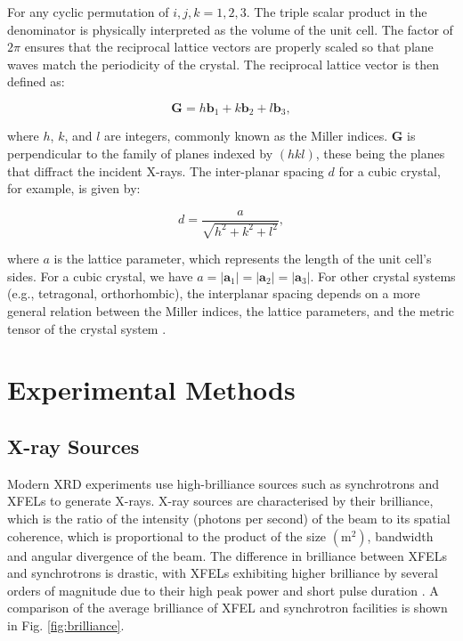 \documentclass[aps,prb,twocolumn,superscriptaddress]{revtex4-2}
\begin{document}
For any cyclic permutation of ${i,j,k} = {1, 2, 3}$. The triple scalar product
in the denominator is physically interpreted as the volume of the unit cell. The
factor of $2\pi$ ensures that the reciprocal lattice vectors are properly scaled
so that plane waves match the periodicity of the crystal. The reciprocal lattice
vector is then defined as:

\begin{equation}\label{eq:reciprocal_vector}
    \mathbf{G} = h\mathbf{b}_1 + k\mathbf{b}_2 + l\mathbf{b}_3,
\end{equation}

where $h$, $k$, and $l$ are integers, commonly known as the Miller indices.
$\mathbf{G}$ is perpendicular to the family of planes indexed by $(hkl)$, these
being the planes that diffract the incident X-rays.  The inter-planar
spacing $d$ for a cubic crystal, for example,
is given by:

\begin{equation}\label{eq:interplanar}
    d = \frac{a}{\sqrt{h^2 + k^2 + l^2}},
\end{equation}

where $a$ is the lattice parameter, which represents the length of the unit
cell's sides.  For a cubic crystal, we have $a = |\textbf{a}_1| = |\textbf{a}_2|
= |\textbf{a}_3|$.  For other crystal systems (e.g., tetragonal, orthorhombic),
the interplanar spacing depends on a more general relation between the Miller
indices, the lattice parameters, and the metric tensor of the crystal system
\cite{Liu2020}.





\section{Experimental Methods} \label{sec:experiment}
\subsection{X-ray Sources}
Modern XRD experiments use high-brilliance sources such as synchrotrons and
XFELs to generate X-rays. X-ray sources are characterised by their brilliance,
which is the ratio of the intensity (photons per second) of the beam to its
spatial coherence, which is proportional to the product of the size
$(\text{m}^2)$, bandwidth and angular divergence of the beam.  The difference in
brilliance between XFELs and synchrotrons is drastic, with XFELs exhibiting
higher brilliance by several orders of magnitude due to their high peak power
and short pulse duration \cite{Baillet2014}. A comparison of the average
brilliance of XFEL and synchrotron facilities is shown in Fig.
\ref{fig:brilliance}.
\end{document}

